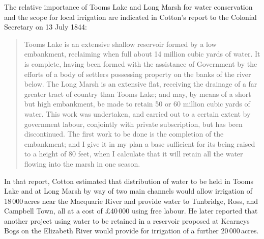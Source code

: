 The relative importance of Tooms Lake and Long Marsh for water
conservation and the scope for local irrigation are indicated in
Cotton's report to the Colonial Secretary on 13 July 1844:
\begin{quote}
	Tooms Lake is an extensive shallow reservoir formed by a low
	embankment, reclaiming when full about 14 million cubic yards
	of water.  It is complete, having been formed with the
	assistance of Government by the efforts of a body of settlers
	possessing property on the banks of the river below.  The Long
	Marsh is an extensive flat, receiving the drainage of a far
	greater tract of country than Tooms Lake; and may, by means of
	a short but high embankment, be made to retain 50 or 60
	million cubic yards of water. This work was undertaken, and
	carried out to a certain extent by government labour,
	conjointly with private subscription, but has been
	discontinued.  The first work to be done is the completion of
	the embankment; and I give it in my plan a base sufficient for
	its being raised to a height of 80 feet, when I calculate that
	it will retain all the water flowing into the marsh in one
	season.
\end{quote}

In that report, Cotton estimated that distribution of water to be held
in Tooms Lake and at Long Marsh by way of two main channels would
allow irrigation of 18\,000\,acres near the Macquarie River and provide
water to Tunbridge,  Ross,  and Campbell
Town,  all at a cost of
\pounds40\,000 using free labour.  He later reported that another project
using water to be retained in a reservoir proposed at Kearneys Bogs
 on
the Elizabeth River  would provide for
irrigation of a further 20\,000\,acres.


